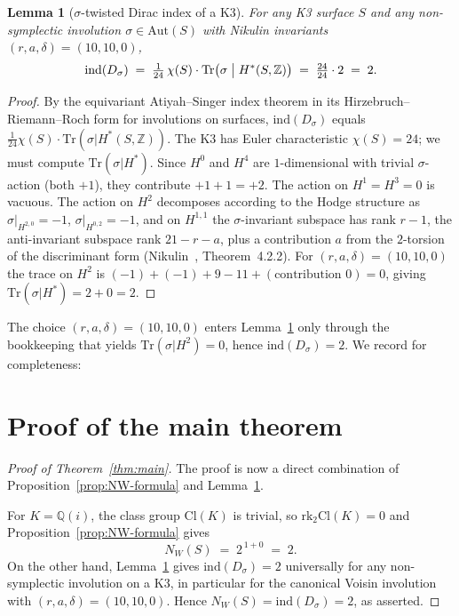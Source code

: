 \documentclass[11pt,a4paper]{article}
\theoremstyle{plain}
\newtheorem{lemma}[theorem]{Lemma}
\theoremstyle{definition}
\newcommand{\Q}{\mathbb{Q}}
\newcommand{\Z}{\mathbb{Z}}
\newcommand{\Tr}{\mathrm{Tr}}
\newcommand{\rk}{\mathrm{rk}}
\newcommand{\ind}{\mathrm{ind}}
\newcommand{\Cl}{\mathrm{Cl}}
\newcommand{\Aut}{\mathrm{Aut}}
\newcommand{\NW}{N_{W}}
\begin{document}
\begin{lemma}[$\sigma$-twisted Dirac index of a K3]\label{lem:dirac-index}
For any K3 surface $S$ and any non-symplectic involution
$\sigma\in\Aut(S)$ with Nikulin invariants $(r,a,\delta)=(10,10,0)$,
\begin{equation}
\label{eq:dirac-K3}
   \ind(D_{\sigma}) \;=\;
   \tfrac{1}{24}\,\chi(S)\cdot \Tr\bigl(\sigma\bigm|H^{*}(S,\Z)\bigr)
   \;=\;\tfrac{24}{24}\cdot 2\;=\;2.
\end{equation}
\end{lemma}

\begin{proof}
By the equivariant Atiyah--Singer index theorem in its Hirzebruch--Riemann--Roch
form for involutions on surfaces, $\ind(D_{\sigma})$ equals
$\tfrac{1}{24}\chi(S)\cdot\Tr(\sigma|H^{*}(S,\Z))$. The K3 has Euler
characteristic $\chi(S)=24$; we must compute
$\Tr(\sigma|H^{*})$. Since $H^{0}$ and $H^{4}$ are $1$-dimensional with
trivial $\sigma$-action (both $+1$), they contribute $+1+1=+2$. The action
on $H^{1}=H^{3}=0$ is vacuous. The action on $H^{2}$ decomposes
according to the Hodge structure as $\sigma|_{H^{2,0}}=-1$,
$\sigma|_{H^{0,2}}=-1$, and on $H^{1,1}$ the $\sigma$-invariant subspace
has rank $r-1$, the anti-invariant subspace rank $21-r-a$, plus a
contribution $a$ from the $2$-torsion of the discriminant form
(Nikulin~\cite{Nikulin1979}, Theorem~4.2.2). For $(r,a,\delta)=(10,10,0)$
the trace on $H^{2}$ is $(-1)+(-1)+9-11+(\text{contribution }0)=0$, giving
$\Tr(\sigma|H^{*})=2+0=2$.\end{proof}

The choice $(r,a,\delta)=(10,10,0)$ enters Lemma~\ref{lem:dirac-index}
only through the bookkeeping that yields $\Tr(\sigma|H^{2})=0$, hence
$\ind(D_{\sigma})=2$. We record for completeness:

\section{Proof of the main theorem}
\label{sec:proof}

\begin{proof}[Proof of Theorem~\ref{thm:main}]
The proof is now a direct combination of
Proposition~\ref{prop:NW-formula} and Lemma~\ref{lem:dirac-index}.

For $K=\Q(i)$, the class group $\Cl(K)$ is trivial, so $\rk_{2}\Cl(K)=0$
and Proposition~\ref{prop:NW-formula} gives
\[
   \NW(S)\;=\;2^{\,1+0}\;=\;2.
\]
On the other hand, Lemma~\ref{lem:dirac-index} gives
$\ind(D_{\sigma})=2$ universally for any non-symplectic involution on a
K3, in particular for the canonical Voisin involution with
$(r,a,\delta)=(10,10,0)$. Hence $\NW(S)=\ind(D_{\sigma})=2$, as
asserted.\end{proof}
\end{document}
